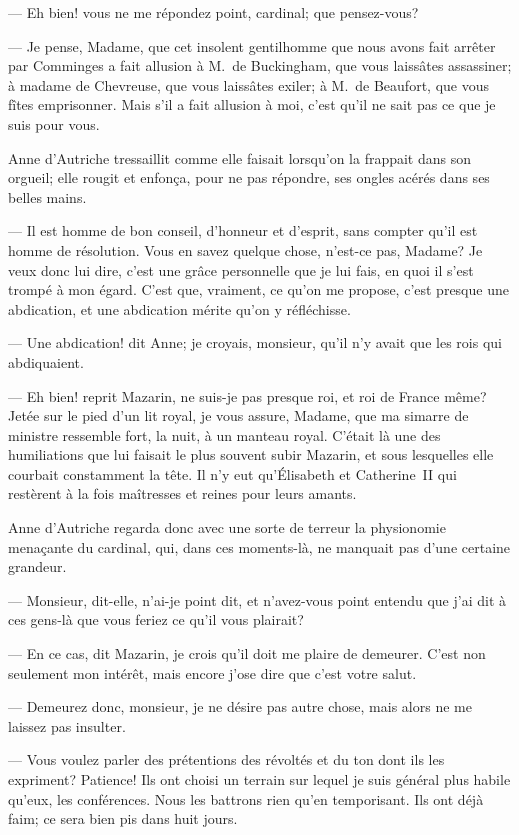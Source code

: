 — Eh bien! vous ne me répondez point, cardinal; que pensez-vous?

— Je pense, Madame, que cet insolent gentilhomme que nous avons fait arrêter par Comminges a fait allusion à M.~de Buckingham, que vous laissâtes assassiner; à madame de Chevreuse, que vous laissâtes exiler; à M.~de Beaufort, que vous fîtes emprisonner. Mais s'il a fait allusion à moi, c'est qu'il ne sait pas ce que je suis pour vous.

Anne d'Autriche tressaillit comme elle faisait lorsqu'on la frappait dans son orgueil; elle rougit et enfonça, pour ne pas répondre, ses ongles acérés dans ses belles mains.

— Il est homme de bon conseil, d'honneur et d'esprit, sans compter qu'il est homme de résolution. Vous en savez quelque chose, n'est-ce pas, Madame? Je veux donc lui dire, c'est une grâce personnelle que je lui fais, en quoi il s'est trompé à mon égard. C'est que, vraiment, ce qu'on me propose, c'est presque une abdication, et une abdication mérite qu'on y réfléchisse.

— Une abdication! dit Anne; je croyais, monsieur, qu'il n'y avait que les rois qui abdiquaient.

— Eh bien! reprit Mazarin, ne suis-je pas presque roi, et roi de France même? Jetée sur le pied d'un lit royal, je vous assure,
Madame, que ma simarre de ministre ressemble fort, la nuit, à un manteau royal.
C'était là une des humiliations que lui faisait le plus souvent subir Mazarin, et sous lesquelles elle courbait constamment la tête. Il n'y eut qu'Élisabeth et Catherine~II qui restèrent à la fois maîtresses et reines pour leurs amants.

Anne d'Autriche regarda donc avec une sorte de terreur la physionomie menaçante du cardinal, qui, dans ces moments-là, ne manquait pas d'une certaine grandeur.

— Monsieur, dit-elle, n'ai-je point dit, et n'avez-vous point entendu que j'ai dit à ces gens-là que vous feriez ce qu'il vous plairait?

— En ce cas, dit Mazarin, je crois qu'il doit me plaire de demeurer. C'est non seulement mon intérêt, mais encore j'ose dire que c'est votre salut.

— Demeurez donc, monsieur, je ne désire pas autre chose, mais alors ne me laissez pas insulter.

— Vous voulez parler des prétentions des révoltés et du ton dont ils les expriment? Patience! Ils ont choisi un terrain sur lequel je suis général plus habile qu'eux, les conférences. Nous les battrons rien qu'en temporisant. Ils ont déjà faim; ce sera bien pis dans huit jours.

